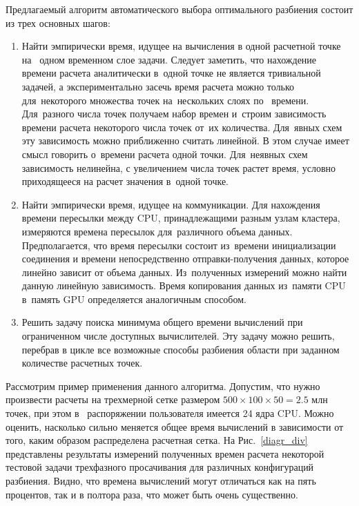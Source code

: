 Предлагаемый алгоритм автоматического выбора оптимального разбиения состоит
из трех основных шагов:
\begin{enumerate}
 \item Найти эмпирически время, идущее на вычисления в одной расчетной точке на~
одном временном слое задачи. Следует заметить, что нахождение времени расчета
аналитически в~одной точке не является тривиальной задачей, а экспериментально засечь
время расчета можно только для~некоторого множества точек на~нескольких слоях по~
времени. Для~разного числа точек получаем набор времен и~строим зависимость времени
расчета некоторого числа точек от~их количества. Для~явных схем эту зависимость
можно приближенно считать линейной. В этом случае имеет смысл говорить о~времени
расчета одной точки. Для~неявных схем зависимость нелинейна, с увеличением числа
точек растет время, условно приходящееся на расчет значения в~одной точке.
\item Найти эмпирически время, идущее на коммуникации. Для нахождения времени
пересылки между CPU, принадлежащими разным узлам кластера, измеряются времена
пересылок для~различного объема данных. Предполагается, что время пересылки
состоит из~времени инициализации соединения и времени непосредственно 
отправки-получения данных, которое линейно зависит от объема данных. Из~полученных 
измерений можно найти данную линейную зависимость. Время копирования данных из~памяти
CPU в~память GPU определяется аналогичным способом.
\item Решить задачу поиска минимума общего времени вычислений при ограниченном
числе доступных вычислителей. Эту задачу можно решить, перебрав в цикле все возможные
способы разбиения области при заданном количестве расчетных точек.
\end{enumerate}
Рассмотрим пример применения данного алгоритма. Допустим, что нужно произвести
расчеты на трехмерной сетке размером $500\times100\times50=2.5$ млн точек, при этом в~
распоряжении пользователя имеется 24 ядра CPU. Можно оценить, насколько сильно
меняется общее время вычислений в зависимости от того, каким образом распределена
расчетная сетка. На Рис.~\ref{diagr_div} представлены результаты измерений полученных времен 
расчета некоторой тестовой задачи трехфазного просачивания для различных конфигураций разбиения.
Видно, что времена вычислений могут отличаться как на пять процентов,
так и в полтора раза, что может быть очень существенно.

